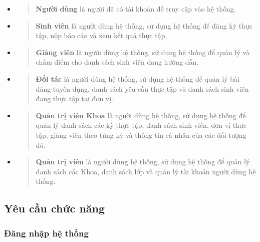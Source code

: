 \documentclass[./../main.tex]{subfiles}
\begin{document}
\begin{itemize}
  \item
    \begin{quote}
    \textbf{Người dùng} là người đã có tài khoản để truy cập vào hệ thống.
    \end{quote}
  \item
    \begin{quote}
    \textbf{Sinh viên} là người dùng hệ thống, sử dụng hệ thống để đăng ký
    thực tập, nộp báo cáo và xem kết quả thực tập.
    \end{quote}
  \item
    \begin{quote}
    \textbf{Giảng viên} là người dùng hệ thống, sử dụng hệ thống để quản
    lý và chấm điểm cho danh sách sinh viên đang hướng dẫn.
    \end{quote}
  \item
    \begin{quote}
    \textbf{Đối tác} là người dùng hệ thống, sử dụng hệ thống để quản lý
    bài đăng tuyển dụng, danh sách yêu cầu thực tập và danh sách sinh viên
    đang thực tập tại đơn vị.
    \end{quote}
  \item
    \begin{quote}
    \textbf{Quản trị viên Khoa} là người dùng hệ thống, sử dụng hệ thống
    để quản lý danh sách các kỳ thực tập, danh sách sinh viên, đơn vị thực
    tập, giảng viên theo từng kỳ và thông tin cá nhân của các đối tượng
    đó.
    \end{quote}
  \item
    \begin{quote}
    \textbf{Quản trị viên} là người dùng hệ thống, sử dụng hệ thống để
    quản lý danh sách các Khoa, danh sách lớp và quản lý tài khoản người
    dùng hệ thống.
    \end{quote}
  \end{itemize}

  \subsection{Yêu cầu chức năng}

  \hypertarget{ux111ux103ng-nhux1eadp-hux1ec7-thux1ed1ng}{%
  \subsubsection{Đăng nhập hệ
  thống}\label{ux111ux103ng-nhux1eadp-hux1ec7-thux1ed1ng}}
  
\end{document}
